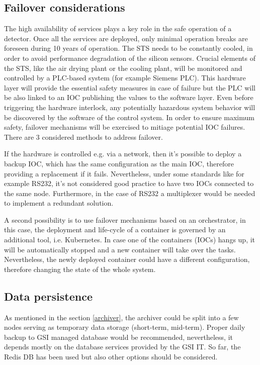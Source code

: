 \subsection{Failover considerations}
The high availability of services plays a key role in the safe operation of a detector. Once all the services are deployed, only minimal operation breaks are foreseen during 10 years of operation. The STS needs to be constantly cooled, in order to avoid performance degradation of the silicon sensors.
Crucial elements of the STS, like the air drying plant or the cooling plant, will be monitored and controlled by a PLC-based system (for example Siemens PLC). This hardware layer will provide the essential safety measures in case of failure but the PLC will be also linked to an IOC publishing the values to the software layer. Even before triggering the hardware interlock, any potentially hazardous system behavior will be discovered by the software of the control system. In order to ensure maximum safety, failover mechanisms will be exercised to mitiage potential IOC failures. There are 3 considered methods to address failover. 


If the hardware is controlled e.g. via a network, then it's possible to deploy a backup IOC, which has the same configuration as the main IOC, therefore providing a replacement if it fails. Nevertheless, under some standards like for example RS232, it's not considered good practice to have two IOCs connected to the same node. Furthermore, in the case of RS232 a multiplexer would be needed to implement a redundant solution. 

A second possibility is to use failover mechanisms based on an orchestrator, in this case, the deployment and life-cycle of a container is governed by an additional tool, i.e. Kubernetes. In case one of the containers (IOCs) hangs up, it will be automatically stopped and a new container will take over the tasks. Nevertheless, the newly deployed container could have a different configuration, therefore changing the state of the whole system. 


\subsection{Data persistence}

As mentioned in the section \ref{archiver}, the archiver could be split into a few nodes serving as temporary data storage (short-term, mid-term). Proper daily backup to GSI managed database would be recommended, nevertheless, it depends mostly on the database services provided by the GSI IT. So far, the Redis DB has been used but also other options should be considered. 

